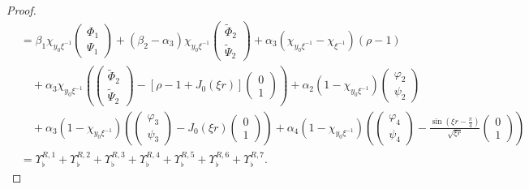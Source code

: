 \documentclass[11 pt]{amsart}
\theoremstyle{definition}
\theoremstyle{remark}
\numberwithin{equation}{section}
\begin{document}
\begin{proof}
\begin{align*}
& = \beta_1 \chi_{y_0\xi^{-1}}\begin{pmatrix}\Phi_1\\ \Psi_1\end{pmatrix}+(\beta_2-\alpha_3) \chi_{y_0\xi^{-1}}\begin{pmatrix} \widetilde \Phi_2\\ \widetilde \Psi_2\end{pmatrix}+\alpha_3 (\chi_{y_0\xi^{-1}}-\chi_{\xi^{-1}}) (\rho-1) \\
& \quad +\alpha_3 \chi_{y_0\xi^{-1}}\left( \begin{pmatrix} \widetilde \Phi_2\\ \widetilde \Psi_2\end{pmatrix}-[\rho-1+J_0(\xi r)]\begin{pmatrix} 0 \\ 1\end{pmatrix}\right) + \alpha_2 (1-\chi_{y_0\xi^{-1}})\begin{pmatrix} \varphi_2 \\ \psi_2 \end{pmatrix}\\
& \quad+ \alpha_3 (1-\chi_{y_0 \xi^{-1}})\left( \begin{pmatrix} \varphi_3 \\ \psi_3 \end{pmatrix}-J_0(\xi r)\begin{pmatrix} 0 \\ 1 \end{pmatrix}\right) +\alpha_4 (1-\chi_{y_0\xi^{-1}})\left( \begin{pmatrix} \varphi_4 \\ \psi_4 \end{pmatrix} -\frac{\sin (\xi r-\frac \pi 4)}{\sqrt{\xi r}}\begin{pmatrix} 0 \\ 1 \end{pmatrix} \right)\\
& =\Upsilon^{R,1}_\flat +\Upsilon^{R,2}_\flat +\Upsilon^{R,3}_\flat +\Upsilon^{R,4}_\flat +\Upsilon^{R,5}_\flat +\Upsilon^{R,6}_\flat +\Upsilon^{R,7}_\flat .
\end{align*}

\smallskip


\end{proof}
\end{document}
